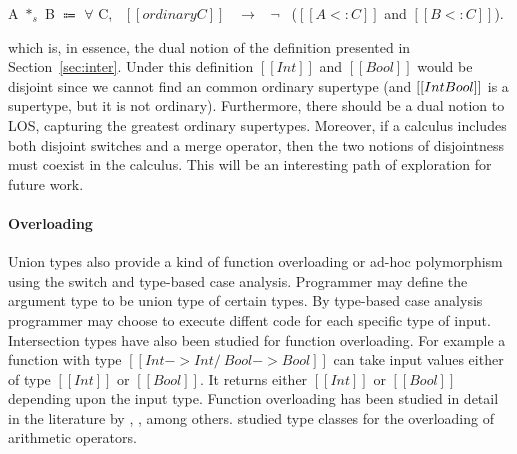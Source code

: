 \begin{definition}
\label{def:related:disj}
  A $*_s$ B $\Coloneqq$ $\forall$ C, \ $[[ordinary C]]$ \ $\rightarrow$ \ $\neg$ \ ($[[A <: C]]$ and $[[B <: C]]$).
\end{definition}

\noindent which is, in essence, the dual notion of the definition presented in
Section~\ref{sec:inter}. Under this definition $[[Int]]$ and $[[Bool]]$ would
be disjoint since we cannot find an common ordinary supertype (and $[[Int \/ Bool]]$
is a supertype, but it is not ordinary). Furthermore, there should be a
dual notion to LOS, capturing the greatest ordinary supertypes. Moreover,
if a calculus includes both disjoint switches and a merge operator,
then the two notions of disjointness must coexist in the calculus. 
This will be an interesting path of exploration for future work.

\paragraph{Overloading}
Union types also provide a kind of function overloading or ad-hoc
polymorphism using the switch and type-based case analysis. Programmer
may define the argument type to be union type of certain types. By
type-based case analysis programmer may choose to execute diffent code
for each specific type of input.  Intersection types have also been
studied for function overloading. For example a function with type
$[[Int -> Int /\ Bool -> Bool]]$ can take input values either of type
$[[Int]]$ or $[[Bool]]$.  It returns either $[[Int]]$ or $[[Bool]]$
depending upon the input type.  Function overloading has been studied
in detail in the literature by \cite{castagna1995calculus},
\cite{cardelli1985understanding}, \cite{stuckey2005theory} among
others.  \citet{wadler1989make} studied type classes for the
overloading of arithmetic operators.

